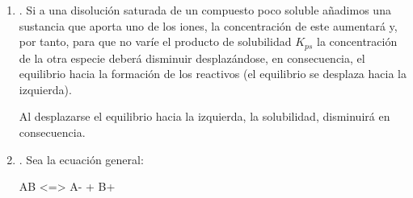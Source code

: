     \begin{enumerate}[label=\numberballmDarkTeal]
        \item {}.
        Si a una disolución saturada de un compuesto poco soluble añadimos una sustancia que aporta uno de los iones,  la concentración de este aumentará y, por tanto, para que no varíe el producto de solubilidad  \( K_{ps} \)  la concentración de la otra especie deberá disminuir desplazándose, en consecuencia, el equilibrio hacia la formación de los reactivos (el equilibrio se desplaza hacia la izquierda).

        Al desplazarse el equilibrio hacia la izquierda, la solubilidad, disminuirá en consecuencia.
%

        \item {}.
        Sea la ecuación general:
        \begin{reaction*}
            AB \sld{} <=> A- \aq{} + B+ \aq{}
        \end{reaction*}


\end{enumerate}
